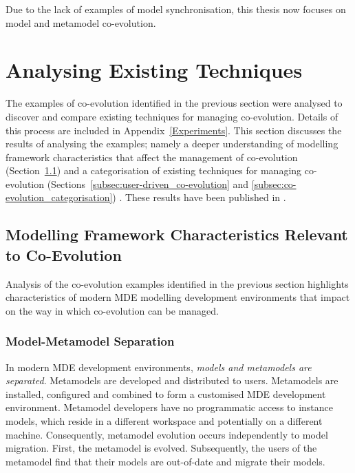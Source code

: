 Due to the lack of examples of model synchronisation, this thesis now focuses on model and metamodel co-evolution. 



\section{Analysing Existing Techniques}
\label{sec:analysing_existing_techniques}
The examples of co-evolution identified in the previous section were analysed to discover and compare existing techniques for managing co-evolution. Details of this process are included in Appendix~\ref{Experiments}. This section discusses the results of analysing the examples; namely a deeper understanding of modelling framework characteristics that affect the management of co-evolution (Section~\ref{subsec:modelling_framework_characteristics}) and a categorisation of existing techniques for managing co-evolution (Sections~\ref{subsec:user-driven_co-evolution} and \ref{subsec:co-evolution_categorisation}) . These results have been published in \cite{rose09analysis,rose10flock}.


\subsection{Modelling Framework Characteristics Relevant to Co-Evolution}
\label{subsec:modelling_framework_characteristics}
Analysis of the co-evolution examples identified in the previous section highlights characteristics of modern MDE modelling development environments that impact on the way in which co-evolution can be managed.

\subsubsection{Model-Metamodel Separation}
In modern MDE development environments, \emph{models and metamodels are separated}. Metamodels are developed and distributed to users. Metamodels are installed, configured and combined to form a customised MDE development environment. Metamodel developers have no programmatic access to instance models, which reside in a different workspace and potentially on a different machine. Consequently, metamodel evolution occurs independently to model migration. First, the metamodel is evolved. Subsequently, the users of the metamodel find that their models are out-of-date and migrate their models.

